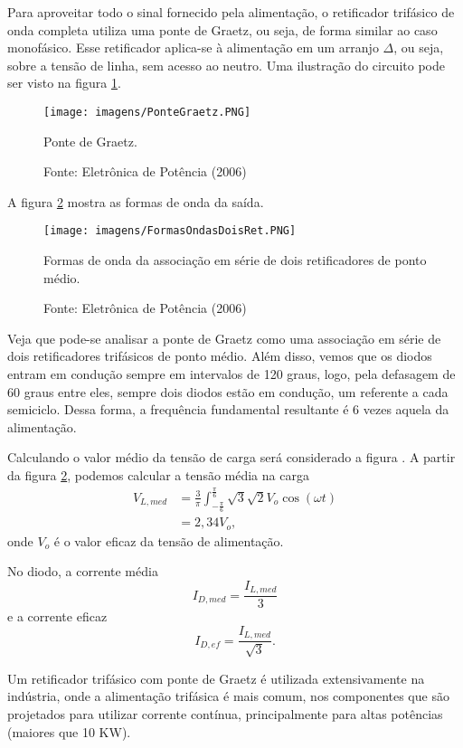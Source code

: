 Para aproveitar todo o sinal fornecido pela alimentação, o retificador trifásico de onda completa utiliza uma ponte de Graetz, ou seja, de forma similar ao caso monofásico. Esse retificador aplica-se à alimentação em um arranjo $\Delta$, ou seja, sobre a tensão de linha, sem acesso ao neutro. Uma ilustração do circuito pode ser visto na figura \ref{fig:PGz}.

\begin{figure}[hb]
    \center
    \texttt{[image: imagens/PonteGraetz.PNG]}
    \caption{Ponte de Graetz.}\label{fig:PGz}
    \caption*{Fonte: Eletrônica de Potência (2006)}
\end{figure}

A figura \ref{fig:FOASDRPM} mostra as formas de onda da saída.

\begin{figure}[ht]
    \center
    \texttt{[image: imagens/FormasOndasDoisRet.PNG]}
    \caption{Formas de onda da associação em série de dois retificadores de ponto médio.}\label{fig:FOASDRPM}
    \caption*{Fonte: Eletrônica de Potência (2006)}
\end{figure}

Veja que pode-se analisar a ponte de Graetz como uma associação em série de dois retificadores trifásicos de ponto médio. Além disso, vemos que os diodos entram em condução sempre em intervalos de 120 graus, logo, pela defasagem de 60 graus entre eles, sempre dois diodos estão em condução, um referente a cada semiciclo. Dessa forma, a frequência fundamental resultante é 6 vezes aquela da alimentação.

Calculando o valor médio da tensão de carga será considerado a figura .
A partir da figura \ref{fig:FOASDRPM}, podemos calcular a tensão média na carga
\begin{align*}
V_{L,med} &= \frac{3}{\pi}{\int_{-\frac{\pi}{6}}^{\frac{\pi}{6}}}{\sqrt{3}{\sqrt{2}}{V_o}}\cos(\omega{t}) \\
&= 2,34 V_o
,\end{align*} 
onde $V_o$ é o valor eficaz da tensão de alimentação.

No diodo, a corrente média \[
    I_{D,med} = \frac{I_{L,med}}{3}
\] e a corrente eficaz \[
    I_{D,ef} = \frac{I_{L,med}}{\sqrt{3}}
.\]

Um retificador trifásico com ponte de Graetz é utilizada extensivamente na indústria, onde a alimentação trifásica é mais comum, nos componentes que são projetados para utilizar corrente contínua, principalmente para altas potências (maiores que 10 KW).

